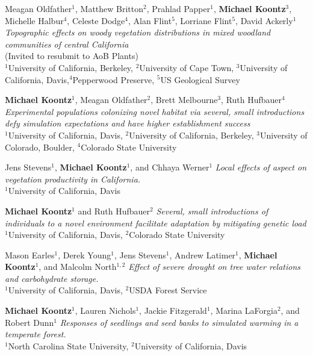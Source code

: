 \documentclass[11pt,english]{article}
\providecommand{\tabularnewline}{\\}
\begin{document}
\begin{hangparas}{0.4in}{1}

\hspace{0.575em}Meagan Oldfather$^{1}$, Matthew Britton$^{2}$, Prahlad Papper$^{1}$, \textbf{Michael Koontz}$^{3}$, Michelle Halbur$^{4}$, Celeste Dodge$^{4}$, Alan Flint$^{5}$, Lorriane Flint$^{5}$, David Ackerly$^{1}$
\emph{Topographic effects on woody vegetation distributions in mixed woodland communities of central California} \tabularnewline
(Invited to resubmit to AoB Plants) \tabularnewline
$^{1}$University of California, Berkeley, $^{2}$University of Cape Town, $^{3}$University of California, Davis,$^{4}$Pepperwood Preserve, $^{5}$US Geological Survey

\hspace{0.575em}\textbf{Michael Koontz}$^{1}$, Meagan Oldfather$^{2}$, Brett Melbourne$^{3}$, Ruth Hufbauer$^{4}$
\emph{Experimental populations colonizing novel habitat via several, small introductions defy simulation expectations and have higher establishment success} \tabularnewline
$^{1}$University of California, Davis, $^{2}$University of California, Berkeley, $^{3}$University of Colorado, Boulder, $^{4}$Colorado State University 

\hspace{0.575em}Jens Stevens$^{1}$, \textbf{Michael Koontz}$^{1}$, and Chhaya Werner$^{1}$
\emph{Local effects of aspect on vegetation productivity in California.}\tabularnewline
$^{1}$University of California, Davis

\hspace{0.575em}\textbf{Michael Koontz}$^{1}$ and Ruth Hufbauer$^{2}$
\emph{Several, small introductions of individuals to a novel environment facilitate adaptation by mitigating genetic load} \tabularnewline
$^{1}$University of California, Davis, $^{2}$Colorado State University 

\hspace{0.575em}Mason Earles$^{1}$, Derek Young$^{1}$, Jens Stevens$^{1}$, Andrew Latimer$^{1}$, \textbf{Michael Koontz}$^{1}$, and Malcolm North$^{1,2}$
\emph{Effect of severe drought on tree water relations and carbohydrate storage.}\tabularnewline
$^{1}$University of California, Davis, $^{2}$USDA Forest Service

\hspace{0.575em}\textbf{Michael Koontz}$^{1}$, Lauren Nichols$^{1}$, Jackie Fitzgerald$^{1}$, Marina LaForgia$^{2}$, and Robert Dunn$^{1}$ 
\emph{Responses of seedlings and seed banks to simulated warming in a temperate forest.} \tabularnewline
$^{1}$North Carolina State University, $^{2}$University of California, Davis

\end{hangparas}
\vspace{1ex}
\end{document}

